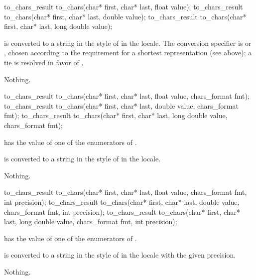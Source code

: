 %
\begin{itemdecl}
to_chars_result to_chars(char* first, char* last, float value);
to_chars_result to_chars(char* first, char* last, double value);
to_chars_result to_chars(char* first, char* last, long double value);
\end{itemdecl}

\begin{itemdescr}
\pnum
\effects {} is converted to a string
in the style of 
in the  locale.
The conversion specifier is  or ,
chosen according to the requirement for a shortest representation
(see above);
a tie is resolved in favor of .

\pnum
\throws Nothing.
\end{itemdescr}

%
\begin{itemdecl}
to_chars_result to_chars(char* first, char* last, float value, chars_format fmt);
to_chars_result to_chars(char* first, char* last, double value, chars_format fmt);
to_chars_result to_chars(char* first, char* last, long double value, chars_format fmt);
\end{itemdecl}

\begin{itemdescr}
\pnum
\requires {} has the value of
one of the enumerators of .

\pnum
\effects {} is converted to a string
in the style of 
in the  locale.

\pnum
\throws Nothing.
\end{itemdescr}

%
\begin{itemdecl}
to_chars_result to_chars(char* first, char* last, float value,
                         chars_format fmt, int precision);
to_chars_result to_chars(char* first, char* last, double value,
                         chars_format fmt, int precision);
to_chars_result to_chars(char* first, char* last, long double value,
                         chars_format fmt, int precision);
\end{itemdecl}

\begin{itemdescr}
\pnum
\requires {} has the value of
one of the enumerators of .

\pnum
\effects {} is converted to a string
in the style of 
in the  locale
with the given precision.

\pnum
\throws Nothing.
\end{itemdescr}

